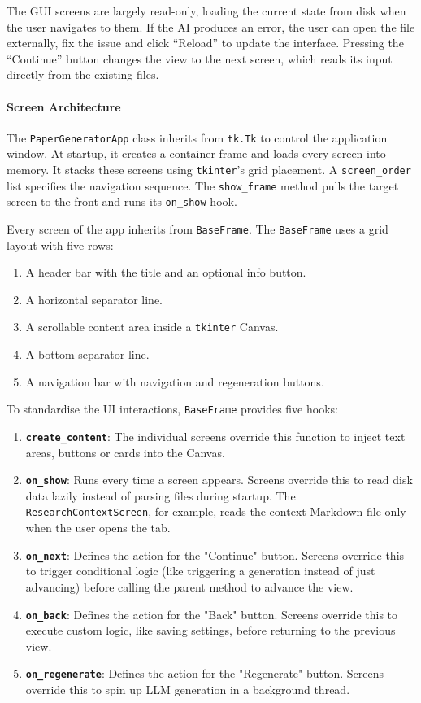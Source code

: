 The GUI screens are largely read-only, loading the current state from disk when the user navigates to them.
If the AI produces an error, the user can open the file externally, fix the issue and click ``Reload'' to update the interface.
Pressing the ``Continue'' button changes the view to the next screen, which reads its input directly from the existing files.

\paragraph{Screen Architecture}
The \texttt{PaperGeneratorApp} class inherits from \texttt{tk.Tk} to control the application window.
At startup, it creates a container frame and loads every screen into memory.
It stacks these screens using \texttt{tkinter}'s grid placement.
A \texttt{screen\_order} list specifies the navigation sequence.
The \texttt{show\_frame} method pulls the target screen to the front and runs its \texttt{on\_show} hook.

Every screen of the app inherits from \texttt{BaseFrame}.
The \texttt{BaseFrame} uses a grid layout with five rows:

\begin{enumerate}[nosep]
	\item A header bar with the title and an optional info button.
	\item A horizontal separator line.
	\item A scrollable content area inside a \texttt{tkinter} Canvas.
	\item A bottom separator line.
	\item A navigation bar with navigation and regeneration buttons.
\end{enumerate}

To standardise the UI interactions, \texttt{BaseFrame} provides five hooks:

\begin{enumerate}[nosep]
	\item \textbf{\texttt{create\_content}}: The individual screens override this function to inject text areas, buttons or cards into the Canvas.
	\item \textbf{\texttt{on\_show}}: Runs every time a screen appears. Screens override this to read disk data lazily instead of parsing files during startup. The \texttt{ResearchContextScreen}, for example, reads the context Markdown file only when the user opens the tab.
	\item \textbf{\texttt{on\_next}}: Defines the action for the "Continue" button. Screens override this to trigger conditional logic (like triggering a generation instead of just advancing) before calling the parent method to advance the view.
	\item \textbf{\texttt{on\_back}}: Defines the action for the "Back" button. Screens override this to execute custom logic, like saving settings, before returning to the previous view.
	\item \textbf{\texttt{on\_regenerate}}: Defines the action for the "Regenerate" button. Screens override this to spin up LLM generation in a background thread.
\end{enumerate}

